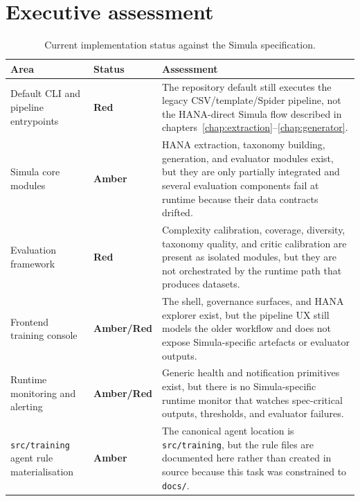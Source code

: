 \documentclass[12pt,a4paper,twoside]{report}
\begin{document}
\section{Executive assessment}
\begin{table}[htbp]
\centering
\footnotesize
\caption{Current implementation status against the Simula specification.}
\label{tab:simula-gap-summary}
\begin{tabularx}{\textwidth}{@{}l l X@{}}
\toprule
\textbf{Area} & \textbf{Status} & \textbf{Assessment} \\
\midrule
Default CLI and pipeline entrypoints & \textbf{Red} & The repository default still executes the legacy CSV/template/Spider pipeline, not the HANA-direct Simula flow described in chapters~\ref{chap:extraction}--\ref{chap:generator}. \\
Simula core modules & \textbf{Amber} & HANA extraction, taxonomy building, generation, and evaluator modules exist, but they are only partially integrated and several evaluation components fail at runtime because their data contracts drifted. \\
Evaluation framework & \textbf{Red} & Complexity calibration, coverage, diversity, taxonomy quality, and critic calibration are present as isolated modules, but they are not orchestrated by the runtime path that produces datasets. \\
Frontend training console & \textbf{Amber/Red} & The shell, governance surfaces, and HANA explorer exist, but the pipeline UX still models the older workflow and does not expose Simula-specific artefacts or evaluator outputs. \\
Runtime monitoring and alerting & \textbf{Amber/Red} & Generic health and notification primitives exist, but there is no Simula-specific runtime monitor that watches spec-critical outputs, thresholds, and evaluator failures. \\
\texttt{src/training} agent rule materialisation & \textbf{Amber} & The canonical agent location is \texttt{src/training}, but the rule files are documented here rather than created in source because this task was constrained to \texttt{docs/}. \\
\bottomrule
\end{tabularx}
\end{table}
\end{document}
